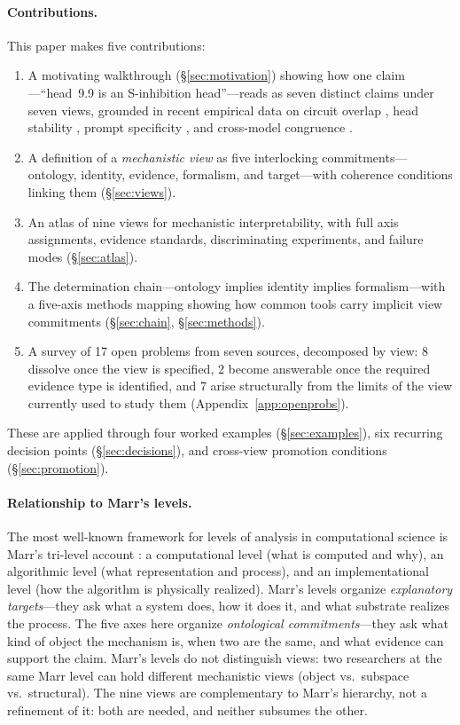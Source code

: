 \documentclass{article}
\begin{document}
\paragraph{Contributions.}
This paper makes five contributions:
\begin{enumerate}[leftmargin=*]
\item A motivating walkthrough (\S\ref{sec:motivation}) showing how one
      claim---``head~9.9 is an S-inhibition head''---reads as seven
      distinct claims under seven views, grounded in recent empirical
      data on circuit overlap \citep{merullo2024}, head stability
      \citep{bali2026}, prompt specificity \citep{franco2026}, and
      cross-model congruence \citep{sun2026}.
\item A definition of a \emph{mechanistic view} as five interlocking
      commitments---ontology, identity, evidence, formalism, and
      target---with coherence conditions linking them
      (\S\ref{sec:views}).
\item An atlas of nine views for mechanistic interpretability,
      with full axis assignments, evidence standards, discriminating
      experiments, and failure modes (\S\ref{sec:atlas}).
\item The determination chain---ontology implies identity implies
      formalism---with a five-axis methods mapping showing how common
      tools carry implicit view commitments
      (\S\ref{sec:chain}, \S\ref{sec:methods}).
\item A survey of 17 open problems from seven sources, decomposed by
      view: 8 dissolve once the view is specified, 2 become answerable
      once the required evidence type is identified, and 7 arise
      structurally from the limits of the view currently used to study
      them (Appendix~\ref{app:openprobs}).
\end{enumerate}
These are applied through four worked examples (\S\ref{sec:examples}),
six recurring decision points (\S\ref{sec:decisions}), and
cross-view promotion conditions (\S\ref{sec:promotion}).

\paragraph{Relationship to Marr's levels.}
The most well-known framework for levels of analysis in computational
science is Marr's tri-level account \citep{marr1982}: a computational
level (what is computed and why), an algorithmic level (what
representation and process), and an implementational level (how the
algorithm is physically realized).  Marr's levels organize
\emph{explanatory targets}---they ask what a system does, how it does
it, and what substrate realizes the process.  The five axes here
organize \emph{ontological commitments}---they ask what kind of object
the mechanism is, when two are the same, and what evidence can support
the claim.  Marr's levels do not distinguish views: two researchers
at the same Marr level can hold different mechanistic views (object vs.\
subspace vs.\ structural).  The nine views are complementary to Marr's
hierarchy, not a refinement of it: both are needed, and neither
subsumes the other.
\end{document}
